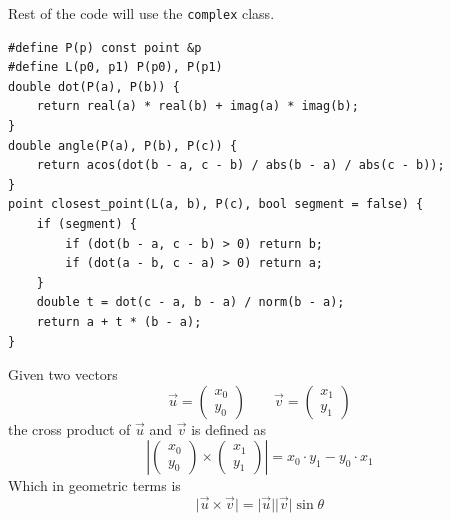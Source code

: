 \documentclass{beamer}
\begin{document}
\begin{frame}
  \vspace{20pt}
  Rest of the code will use the \texttt{complex} class.
  \footnotesize
  \begin{verbatim}
#define P(p) const point &p
#define L(p0, p1) P(p0), P(p1)
double dot(P(a), P(b)) { 
    return real(a) * real(b) + imag(a) * imag(b);
}
double angle(P(a), P(b), P(c)) {
    return acos(dot(b - a, c - b) / abs(b - a) / abs(c - b)); 
}
point closest_point(L(a, b), P(c), bool segment = false) {
    if (segment) {
        if (dot(b - a, c - b) > 0) return b;
        if (dot(a - b, c - a) > 0) return a;
    }
    double t = dot(c - a, b - a) / norm(b - a);
    return a + t * (b - a);
}
  \end{verbatim}
\end{frame}
\begin{frame}[plain]
  \vspace{20pt}
  Given two vectors
  \[
    \vec{u} = \begin{pmatrix} x_0 \\ y_0 \end{pmatrix} \quad\quad
    \vec{v} = \begin{pmatrix} x_1 \\ y_1 \end{pmatrix}
  \]
  the cross product of $\vec{u}$ and $\vec{v}$ is defined as 
  \[
    \left\lvert \begin{pmatrix} x_0 \\ y_0 \end{pmatrix} \times
    \begin{pmatrix} x_1 \\ y_1 \end{pmatrix}\right\rvert  = 
    x_0\cdot y_1 - y_0 \cdot x_1
  \]
  Which in geometric terms is
  \[
    \lvert \vec{u} \times \vec{v} \vert = 
    \lvert \vec{u} \rvert \lvert \vec{v} \rvert \sin \theta
  \]
\end{frame}
\end{document}
